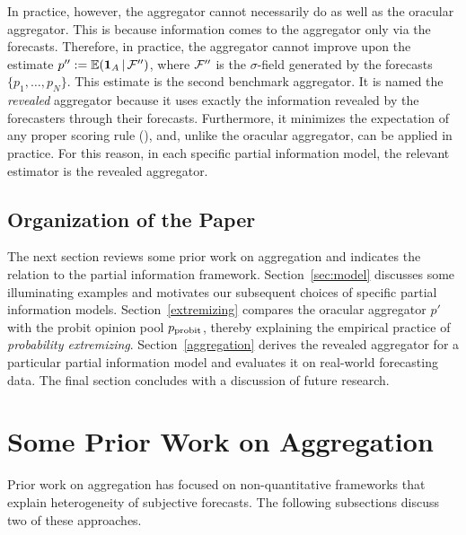 \documentclass[11pt]{article}
\newcommand{\E}{\mathbb{E}}
\theoremstyle{definition}
\theoremstyle{definition}
\def\one{{\bf 1}}
\def\F{{\cal F}}
\def\E{{\mathbb E}}
\def\|{\, | \,}
\def\probit{p_{\rm probit}}
\begin{document}
In practice, however, the aggregator cannot necessarily do as well as the oracular aggregator.  This is because information comes to the aggregator only via the forecasts. Therefore, in practice, the 
aggregator cannot improve upon the estimate $p'' := \E (\one_A \| \F'')$,
where $\F''$ is the $\sigma$-field generated by the forecasts
$\{ p_1 , \ldots , p_N \}$. This estimate is the second benchmark aggregator. It is named the {\em revealed} aggregator 
because it uses exactly the information revealed by the forecasters
through their forecasts.  Furthermore, it minimizes the expectation of any proper scoring rule (\citealt{Ranjan08}), and, unlike the oracular aggregator, can be applied in practice. For this reason, in each specific partial information model, the relevant estimator 
is the revealed aggregator. 





\subsection{Organization of the Paper}

The next section reviews some prior work on aggregation and 
indicates the relation to the partial information framework.
Section~\ref{sec:model} discusses some illuminating examples 
and motivates our subsequent choices of specific partial information 
models.  Section~\ref{extremizing} compares the oracular
aggregator $p'$ with the probit opinion pool $\probit$, thereby
explaining the empirical practice of {\em probability extremizing}.
Section~\ref{aggregation} derives the revealed aggregator for a
particular partial information model and evaluates it on real-world forecasting data.  The final section concludes with a discussion of future research.



\section{Some Prior Work on Aggregation}
\label{sec:prior}

Prior work on aggregation has focused on non-quantitative
frameworks that explain heterogeneity of subjective forecasts.  
The following subsections discuss two of these approaches. 
\end{document}
